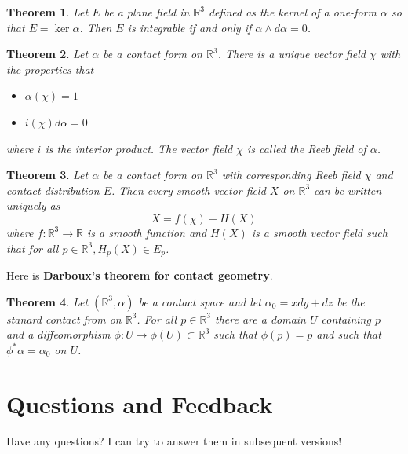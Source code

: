 \documentclass{article}
\newtheorem{theorem}{Theorem}[section]
\theoremstyle{definition}
\begin{document}
\begin{theorem} Let $E$ be a plane field in $\mathbb{R}^{3}$ defined as the
  kernel of a one-form $\alpha$ so that $E = \ker \alpha$. Then $E$ is
  integrable if and only if $\alpha \wedge d\alpha = 0$.
\end{theorem}

\begin{theorem} Let $\alpha$ be a contact form on $\mathbb{R}^{3}$. There is a
  unique vector field $\chi$ with the properties that
  \begin{itemize}
    \item $\alpha(\chi) = 1$
    \item $i(\chi)d\alpha = 0$
  \end{itemize}

  where $i$ is the interior product. The vector field $\chi$ is called the \textit{Reeb field} of $\alpha$.
\end{theorem}

\begin{theorem} Let $\alpha$ be a contact form on $\mathbb{R}^{3}$ with
  corresponding Reeb field $\chi$ and contact distribution $E$. Then every
  smooth vector field $X$ on $\mathbb{R}^{3}$ can be written uniquely as
  \begin{equation*}
    X = f(\chi) + H(X)
  \end{equation*}
  where $f : \mathbb{R}^{3} \to \mathbb{R}$ is a smooth function and $H(X)$ is a
  smooth vector field such that for all $p \in \mathbb{R}^{3}, H_{p}(X) \in E_{p}$.
\end{theorem}

Here is \textbf{Darboux's theorem for contact geometry}. 

\begin{theorem} Let $(\mathbb{R}^{3}, \alpha)$ be a contact space and let
  $\alpha_{0} = xdy + dz$ be the stanard contact from on $\mathbb{R}^{3}$. For
  all $p \in \mathbb{R}^{3}$ there are a domain $U$ containing $p$ and a
  diffeomorphism $\phi : U \to \phi(U) \subset \mathbb{R}^{3}$ such that
  $\phi(p) = p$ and such that $\phi^{*}\alpha = \alpha_{0}$ on $U$.
\end{theorem}

\newpage

\section {Questions and Feedback}

Have any questions? I can try to answer them in subsequent versions!
\end{document}

